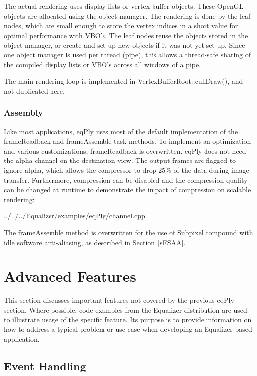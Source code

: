 \documentclass[10pt,a4]{scrartcl}
\newcommand{\sref}[1]{Section~\ref{#1}}
\begin{document}
The actual rendering uses display lists or vertex buffer objects. These
OpenGL objects are allocated using the object manager. The rendering is
done by the leaf nodes, which are small enough to store the vertex
indices in a \textsf{short} value for optimal performance with VBO's.
The leaf nodes reuse the objects stored in the object manager, or create
and set up new objects if it was not yet set up. Since one object
manager is used per thread (pipe), this allows a thread-safe sharing of
the compiled display lists or VBO's across all windows of a pipe.

The main rendering loop is implemented in \textsf{VertexBufferRoot::cullDraw()},
and not duplicated here.

\subsubsection{Assembly}

Like most applications, eqPly uses most of the default implementation of the
\textsf{frameReadback} and \textsf{frameAssemble} task methods. To implement an
optimization and various customizations, \textsf{frameReadback} is
overwritten. eqPly does not need the alpha channel on the destination view. The
output frames are flagged to ignore alpha, which allows the compressor to drop
25\% of the data during image transfer. Furthermore, compression can be
disabled and the compression quality can be changed at runtime to demonstrate
the impact of compression on scalable rendering:

{\footnotesize
  {../../../Equalizer/examples/eqPly/channel.cpp}}

The \textsf{frameAssemble} method is overwritten for the use of Subpixel
compound with idle software anti-aliasing, as described in \sref{sFSAA}.



\section{Advanced Features}

This section discusses important features not covered by the previous
\textsf{eqPly} section. Where possible, code examples from the Equalizer
distribution are used to illustrate usage of the specific feature. Its
purpose is to provide information on how to address a typical problem or
use case when developing an Equalizer-based application.


\subsection{\label{sEventHandling}Event Handling}
\end{document}
